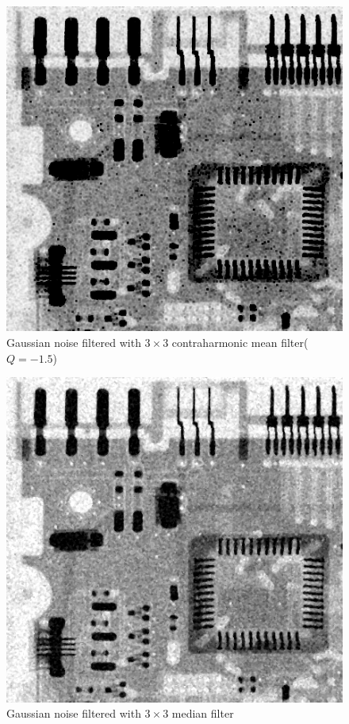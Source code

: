 \documentclass{article}
\begin{document}
\begin{figure}[H]
	\centering
	\includegraphics[width=336pt]{../result/task2/gauss/gauss-contraharmonic.png}
	\caption{Gaussian noise filtered with $3 \times 3$ contraharmonic mean filter($Q = -1.5$)}
	\label{fig:gausschm}
\end{figure}

\begin{figure}[H]
	\centering
	\includegraphics[width=336pt]{../result/task2/gauss/gauss-median.png}
	\caption{Gaussian noise filtered with $3 \times 3$ median filter}
	\label{fig:gaussm}
\end{figure}
\end{document}
